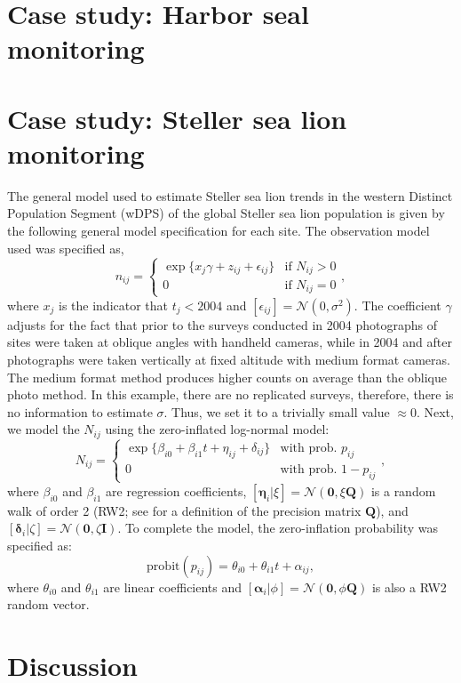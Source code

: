 \documentclass[12pt,letter]{article}
\newcommand{\Nij}{\ensuremath{N_{ij}}}
\newcommand{\fN}{\ensuremath{\mathcal{N}}}
\begin{document}
 


\section{Case study: Harbor seal monitoring}

\section{Case study: Steller sea lion monitoring}

The general model used to estimate Steller sea lion trends in the western Distinct Population Segment (wDPS) of the global Steller sea lion population is given by the following general model specification for each site. The observation model used was specified as,
\begin{equation}
n_{ij} = \left\{
	\begin{array}{ll} 
	\exp\{x_j \gamma + z_{ij} + \epsilon_{ij}\}& \mbox{if } N_{ij}>0\\
	0 & \mbox{if } N_{ij}=0
	\end{array}\right.,
\end{equation}
where $x_j$ is the indicator that $t_j < 2004$ and $[\epsilon_{ij}]=\fN(0,\sigma^2)$. The coefficient $\gamma$ adjusts for the fact that prior to the surveys conducted in 2004 photographs of sites were taken at oblique angles with handheld cameras, while in 2004 and after photographs were taken vertically at fixed altitude with medium format cameras. The medium format method produces higher counts on average than the oblique photo method. In this example, there are no replicated surveys, therefore, there is no information to estimate $\sigma$. Thus, we set it to a trivially small value $\approx 0$. Next, we model the $\Nij$ using the zero-inflated log-normal model:
\begin{equation}
N_{ij} = \left\{
	\begin{array}{ll}
		\exp\{\beta_{i0} + \beta_{i1}t + \eta_{ij} + \delta_{ij}\} & \mbox{with prob. } p_{ij}\\
		0 & \mbox{with prob. } 1-p_{ij}
	\end{array}\right.,
\end{equation}
where $\beta_{i0}$ and $\beta_{i1}$ are regression coefficients, $[\boldsymbol{\eta}_i|\xi] = \fN(\mathbf{0},\xi\mathbf{Q})$ is a random walk of order 2 (RW2; see \citealt{} for a definition of the precision matrix $\mathbf{Q}$), and $[\boldsymbol{\delta}_i|\zeta] = \fN(\mathbf{0},\zeta\mathbf{I})$. 
To complete the model, the zero-inflation probability was specified as:
\begin{equation}
\mbox{probit}(p_{ij}) = \theta_{i0} + \theta_{i1}t + \alpha_{ij},
\end{equation}
where $\theta_{i0}$ and $\theta_{i1}$ are linear coefficients and $[\boldsymbol{\alpha}_i|\phi] = \fN(\mathbf{0},\phi\mathbf{Q})$ is also a RW2 random vector. 



\section{Discussion}
\end{document}
